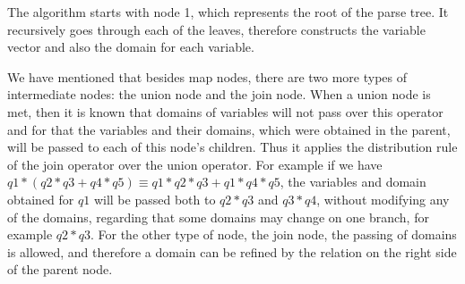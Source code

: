 \documentclass[12pt]{article}
\begin{document}
%	
%	
%	
The algorithm starts with node 1, which represents the root of the parse tree. It recursively goes through each of the leaves, therefore constructs the variable vector and also the domain for each variable.
	
We have mentioned that besides map nodes, there are two more types of intermediate nodes: the union node and the join node. When a union node is met, then it is known that domains of variables will not pass over this operator and for that the variables and their domains, which were obtained in the parent, will be passed to each of this node's children. Thus it applies the distribution rule of the join operator over the union operator. For example if we have $ q1 * (q2 * q3 + q4 * q5) \equiv q1 * q2 * q3 + q1 * q4 * q5$, the variables and domain obtained for $q1$ will be passed both to $q2*q3$ and $q3*q4$, without modifying any of the domains, regarding that some domains may change on one branch, for example $q2*q3$. For the other type of node, the join node, the passing of domains is allowed, and therefore a domain can be refined by the relation on the right side of the parent node.
	
\end{document}
